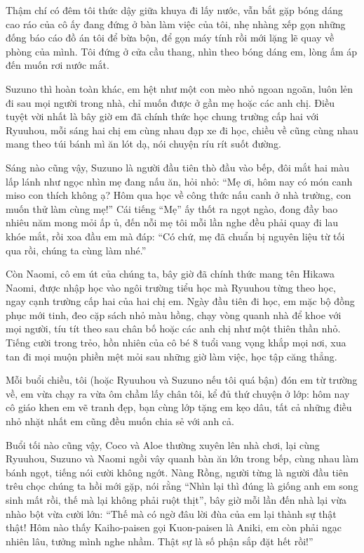 ﻿\documentclass[../main.tex]{subfiles}
\begin{document}
Thậm chí có đêm tôi thức dậy giữa khuya đi lấy nước, vẫn bắt gặp bóng dáng cao ráo của cô ấy đang đứng ở bàn làm việc của tôi, nhẹ nhàng xếp gọn những đống báo cáo đồ án tôi để bừa bộn, để gọn máy tính rồi mới lặng lẽ quay về phòng của mình. Tôi đứng ở cửa cầu thang, nhìn theo bóng dáng em, lòng ấm áp đến muốn rơi nước mắt.

Suzuno thì hoàn toàn khác, em hệt như một con mèo nhỏ ngoan ngoãn, luôn lẻn đi sau mọi người trong nhà, chỉ muốn được ở gần mẹ hoặc các anh chị. Điều tuyệt vời nhất là bây giờ em đã chính thức học chung trường cấp hai với Ryuuhou, mỗi sáng hai chị em cùng nhau đạp xe đi học, chiều về cũng cùng nhau mang theo túi bánh mì ăn lót dạ, nói chuyện ríu rít suốt đường.

Sáng nào cũng vậy, Suzuno là người đầu tiên thò đầu vào bếp, đôi mắt hai màu lấp lánh như ngọc nhìn mẹ đang nấu ăn, hỏi nhỏ: ``Mẹ ơi, hôm nay có món canh miso con thích không ạ? Hôm qua học về công thức nấu canh ở nhà trường, con muốn thử làm cùng mẹ!'' Cái tiếng ``Mẹ'' ấy thốt ra ngọt ngào, đong đầy bao nhiêu năm mong mỏi ấp ủ, đến nỗi mẹ tôi mỗi lần nghe đều phải quay đi lau khóe mắt, rồi xoa đầu em mà đáp: ``Có chứ, mẹ đã chuẩn bị nguyên liệu từ tối qua rồi, chúng ta cùng làm nhé.''

Còn Naomi, cô em út của chúng ta, bây giờ đã chính thức mang tên Hikawa Naomi, được nhập học vào ngôi trường tiểu học mà Ryuuhou từng theo học, ngay cạnh trường cấp hai của hai chị em. Ngày đầu tiên đi học, em mặc bộ đồng phục mới tinh, đeo cặp sách nhỏ màu hồng, chạy vòng quanh nhà để khoe với mọi người, tíu tít theo sau chân bố hoặc các anh chị như một thiên thần nhỏ. Tiếng cười trong trẻo, hồn nhiên của cô bé 8 tuổi vang vọng khắp mọi nơi, xua tan đi mọi muộn phiền mệt mỏi sau những giờ làm việc, học tập căng thẳng.

Mỗi buổi chiều, tôi (hoặc Ryuuhou và Suzuno nếu tôi quá bận) đón em từ trường về, em vừa chạy ra vừa ôm chầm lấy chân tôi, kể đủ thứ chuyện ở lớp: hôm nay cô giáo khen em vẽ tranh đẹp, bạn cùng lớp tặng em kẹo dâu, tất cả những điều nhỏ nhặt nhất em cũng đều muốn chia sẻ với anh cả.

Buổi tối nào cũng vậy, Coco và Aloe thường xuyên lên nhà chơi, lại cùng Ryuuhou, Suzuno và Naomi ngồi vây quanh bàn ăn lớn trong bếp, cùng nhau làm bánh ngọt, tiếng nói cười không ngớt. Nàng Rồng, người từng là người đầu tiên trêu chọc chúng ta hồi mới gặp, nói rằng ``Nhìn lại thì đúng là giống anh em song sinh mất rồi, thế mà lại không phải ruột thịt'', bây giờ mỗi lần đến nhà lại vừa nhào bột vừa cười lớn: ``Thế mà có ngờ đâu lời đùa của em lại thành sự thật thật! Hôm nào thấy Kaiho-paisen gọi Kuon-paisen là Aniki, em còn phải ngạc nhiên lâu, tưởng mình nghe nhầm. Thật sự là số phận sắp đặt hết rồi!''
\end{document}

